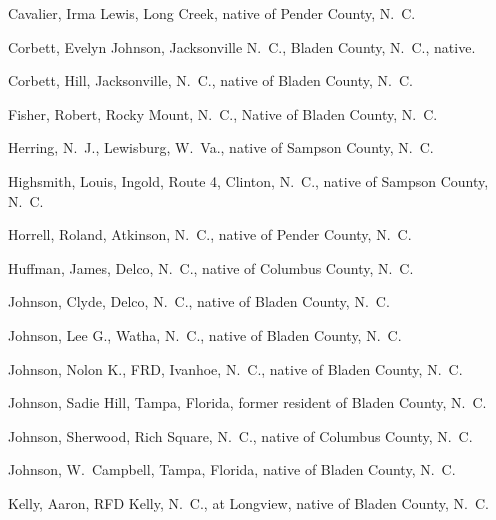 \documentclass[11pt, a5paper, openright]{book}
\begin{document}
\begin{thebibliography}{99}
  Cavalier, Irma Lewis, Long Creek, native of Pender County, N.~C.

  Corbett, Evelyn Johnson, Jacksonville N.~C., Bladen County, N.~C., native.

  Corbett, Hill, Jacksonville, N.~C., native of Bladen County, N.~C.

  Fisher, Robert, Rocky Mount, N.~C., Native of Bladen County, N.~C.

  Herring, N.~J., Lewisburg, W.~Va., native of Sampson County, N.~C.

  Highsmith, Louis, Ingold, Route 4, Clinton, N.~C., native of Sampson
  County, N.~C.

  Horrell, Roland, Atkinson, N.~C., native of Pender County, N.~C.

  Huffman, James, Delco, N.~C., native of Columbus County, N.~C.

  Johnson, Clyde, Delco, N.~C., native of Bladen County, N.~C.

  Johnson, Lee G., Watha, N.~C., native of Bladen County, N.~C.

  Johnson, Nolon K., FRD, Ivanhoe, N.~C., native of Bladen County, N.~C.

  Johnson, Sadie Hill, Tampa, Florida, former resident of Bladen County, N.~C.

  Johnson, Sherwood, Rich Square, N.~C., native of Columbus County, N.~C.

  Johnson, W.~Campbell, Tampa, Florida, native of Bladen County, N.~C.

  Kelly, Aaron, RFD Kelly, N.~C., at Longview, native of Bladen County, N.~C.


\end{thebibliography}
\end{document}
